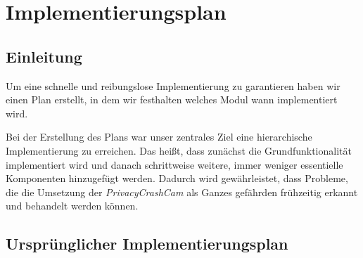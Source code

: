 \chapter{Implementierungsplan} \label{chap:Implementierungsplan}

\section{Einleitung}
Um eine schnelle und reibungslose Implementierung zu garantieren haben wir einen Plan erstellt, in dem wir festhalten welches Modul wann implementiert wird. \par
Bei der Erstellung des Plans war unser zentrales Ziel eine hierarchische Implementierung zu erreichen. Das heißt, dass zunächst die Grundfunktionalität implementiert wird und danach schrittweise weitere, immer weniger essentielle Komponenten hinzugefügt werden. Dadurch wird gewährleistet, dass Probleme, die die Umsetzung der \textit{PrivacyCrashCam} als Ganzes gefährden frühzeitig erkannt und behandelt werden können.\par

\newpage

\section{Ursprünglicher Implementierungsplan}

